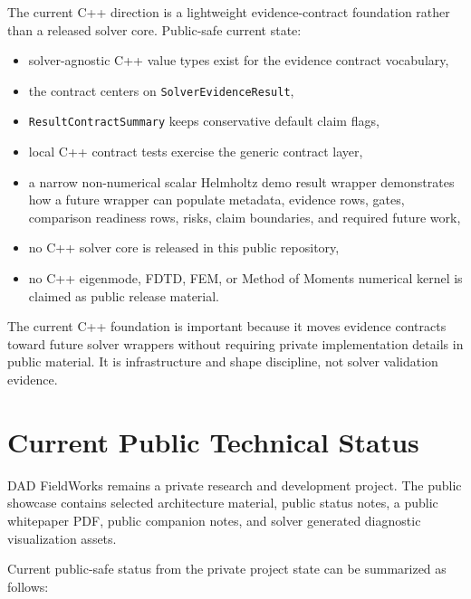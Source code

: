 \documentclass[11pt,a4paper]{article}
\newcommand{\code}[1]{\texttt{#1}}
\begin{document}
The current C++ direction is a lightweight evidence-contract foundation rather than a released solver core. Public-safe current state:

\begin{itemize}
  \item solver-agnostic C++ value types exist for the evidence contract vocabulary,
  \item the contract centers on \code{SolverEvidenceResult},
  \item \code{ResultContractSummary} keeps conservative default claim flags,
  \item local C++ contract tests exercise the generic contract layer,
  \item a narrow non-numerical scalar Helmholtz demo result wrapper demonstrates how a future wrapper can populate metadata, evidence rows, gates, comparison readiness rows, risks, claim boundaries, and required future work,
  \item no C++ solver core is released in this public repository,
  \item no C++ eigenmode, FDTD, FEM, or Method of Moments numerical kernel is claimed as public release material.
\end{itemize}

The current C++ foundation is important because it moves evidence contracts toward future solver wrappers without requiring private implementation details in public material. It is infrastructure and shape discipline, not solver validation evidence.

\section{Current Public Technical Status}
\label{sec:current-public-technical-status}

DAD FieldWorks remains a private research and development project. The public showcase contains selected architecture material, public status notes, a public whitepaper PDF, public companion notes, and solver generated diagnostic visualization assets.

Current public-safe status from the private project state can be summarized as follows:
\end{document}
